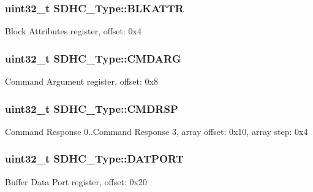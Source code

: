 \subsubsection[{\texorpdfstring{B\+L\+K\+A\+T\+TR}{BLKATTR}}]{ uint32\+\_\+t S\+D\+H\+C\+\_\+\+Type\+::\+B\+L\+K\+A\+T\+TR}\hypertarget{structSDHC__Type_abf0771f8bc90488939e8feccbcd04a17}{}\label{structSDHC__Type_abf0771f8bc90488939e8feccbcd04a17}
Block Attributes register, offset\+: 0x4 
\subsubsection[{\texorpdfstring{C\+M\+D\+A\+RG}{CMDARG}}]{ uint32\+\_\+t S\+D\+H\+C\+\_\+\+Type\+::\+C\+M\+D\+A\+RG}\hypertarget{structSDHC__Type_a817fe46317500419bff67ebd2ec8f10d}{}\label{structSDHC__Type_a817fe46317500419bff67ebd2ec8f10d}
Command Argument register, offset\+: 0x8 
\subsubsection[{\texorpdfstring{C\+M\+D\+R\+SP}{CMDRSP}}]{ uint32\+\_\+t S\+D\+H\+C\+\_\+\+Type\+::\+C\+M\+D\+R\+SP}\hypertarget{structSDHC__Type_a85980d734764e8377f00179befd75336}{}\label{structSDHC__Type_a85980d734764e8377f00179befd75336}
Command Response 0..Command Response 3, array offset\+: 0x10, array step\+: 0x4 
\subsubsection[{\texorpdfstring{D\+A\+T\+P\+O\+RT}{DATPORT}}]{ uint32\+\_\+t S\+D\+H\+C\+\_\+\+Type\+::\+D\+A\+T\+P\+O\+RT}\hypertarget{structSDHC__Type_a18afc87de959a20b1ee89d3987dd2193}{}\label{structSDHC__Type_a18afc87de959a20b1ee89d3987dd2193}
Buffer Data Port register, offset\+: 0x20 
